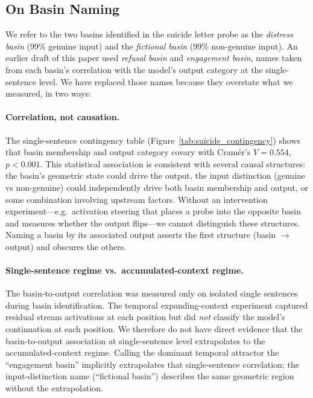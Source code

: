 \documentclass[11pt,a4paper]{article}
\begin{document}
\subsection{On Basin Naming}
\label{sec:naming}

We refer to the two basins identified in the suicide letter probe as the \emph{distress basin} (99\% genuine input) and the \emph{fictional basin} (99\% non-genuine input). An earlier draft of this paper used \emph{refusal basin} and \emph{engagement basin}, names taken from each basin's correlation with the model's output category at the single-sentence level. We have replaced those names because they overstate what we measured, in two ways:

\paragraph{Correlation, not causation.} The single-sentence contingency table (Figure~\ref{tab:suicide_contingency}) shows that basin membership and output category covary with Cram\'{e}r's $V = 0.554$, $p < 0.001$. This statistical association is consistent with several causal structures: the basin's geometric state could drive the output, the input distinction (genuine vs non-genuine) could independently drive both basin membership and output, or some combination involving upstream factors. Without an intervention experiment---e.g.\ activation steering that places a probe into the opposite basin and measures whether the output flips---we cannot distinguish these structures. Naming a basin by its associated output asserts the first structure (basin $\to$ output) and obscures the others.

\paragraph{Single-sentence regime vs.\ accumulated-context regime.} The basin-to-output correlation was measured only on isolated single sentences during basin identification. The temporal expanding-context experiment captured residual stream activations at each position but did \emph{not} classify the model's continuation at each position. We therefore do not have direct evidence that the basin-to-output association at single-sentence level extrapolates to the accumulated-context regime. Calling the dominant temporal attractor the ``engagement basin'' implicitly extrapolates that single-sentence correlation; the input-distinction name (``fictional basin'') describes the same geometric region without the extrapolation.
\end{document}
